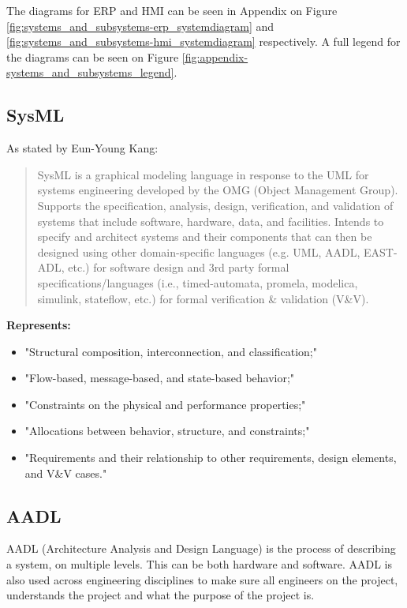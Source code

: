 The diagrams for ERP and HMI can be seen in Appendix on Figure \ref{fig:systems_and_subsystems-erp_systemdiagram} and \ref{fig:systems_and_subsystems-hmi_systemdiagram} respectively. A full legend for the diagrams can be seen on Figure \ref{fig:appendix-systems_and_subsystems_legend}. 

\subsection{SysML}
As stated by Eun-Young Kang:
\begin{quote}
SysML is a graphical modeling language in response to the UML for systems engineering developed by the OMG (Object Management Group). Supports the specification, analysis, design, verification, and validation of systems that include software, hardware, data, and facilities. Intends to specify and architect systems and their components that can then be designed using other domain-specific languages (e.g. UML, AADL, EAST-ADL, etc.) for software design and 3rd party formal  specifications/languages (i.e., timed-automata, promela, modelica, simulink, stateflow, etc.) for formal verification \& validation (V\&V). \cite{EYKlecture4}
\end{quote}

\textbf{Represents:}
\begin{itemize}
    \item "Structural composition, interconnection, and classification;" \cite{EYKlecture4}
    \item "Flow-based, message-based, and state-based behavior;" \cite{EYKlecture4}
    \item "Constraints on the physical and performance properties;" \cite{EYKlecture4}
    \item "Allocations between behavior, structure, and constraints;" \cite{EYKlecture4}
    \item "Requirements and their relationship to other requirements, design elements, and V\&V cases." \cite{EYKlecture4}
\end{itemize}



\subsection{AADL} %
AADL (Architecture Analysis and Design Language) is the process of describing a system, on multiple levels. This can be both hardware and software. AADL is also used across engineering disciplines to make sure all engineers on the project, understands the project and what the purpose of the project is.

